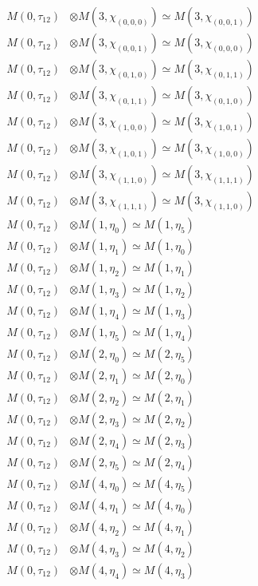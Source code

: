 \begin{align*}
M(0,\tau_{12}) &\otimes M(3,\chi_{(0,0,0)}) \simeq M(3,\chi_{(0,0,1)}) \\
M(0,\tau_{12}) &\otimes M(3,\chi_{(0,0,1)}) \simeq M(3,\chi_{(0,0,0)}) \\
M(0,\tau_{12}) &\otimes M(3,\chi_{(0,1,0)}) \simeq M(3,\chi_{(0,1,1)}) \\
M(0,\tau_{12}) &\otimes M(3,\chi_{(0,1,1)}) \simeq M(3,\chi_{(0,1,0)}) \\
M(0,\tau_{12}) &\otimes M(3,\chi_{(1,0,0)}) \simeq M(3,\chi_{(1,0,1)}) \\
M(0,\tau_{12}) &\otimes M(3,\chi_{(1,0,1)}) \simeq M(3,\chi_{(1,0,0)}) \\
M(0,\tau_{12}) &\otimes M(3,\chi_{(1,1,0)}) \simeq M(3,\chi_{(1,1,1)}) \\
M(0,\tau_{12}) &\otimes M(3,\chi_{(1,1,1)}) \simeq M(3,\chi_{(1,1,0)}) \\
M(0,\tau_{12}) &\otimes M(1,\eta_{0}) \simeq M(1,\eta_{5}) \\
M(0,\tau_{12}) &\otimes M(1,\eta_{1}) \simeq M(1,\eta_{0}) \\
M(0,\tau_{12}) &\otimes M(1,\eta_{2}) \simeq M(1,\eta_{1}) \\
M(0,\tau_{12}) &\otimes M(1,\eta_{3}) \simeq M(1,\eta_{2}) \\
M(0,\tau_{12}) &\otimes M(1,\eta_{4}) \simeq M(1,\eta_{3}) \\
M(0,\tau_{12}) &\otimes M(1,\eta_{5}) \simeq M(1,\eta_{4}) \\
M(0,\tau_{12}) &\otimes M(2,\eta_{0}) \simeq M(2,\eta_{5}) \\
M(0,\tau_{12}) &\otimes M(2,\eta_{1}) \simeq M(2,\eta_{0}) \\
M(0,\tau_{12}) &\otimes M(2,\eta_{2}) \simeq M(2,\eta_{1}) \\
M(0,\tau_{12}) &\otimes M(2,\eta_{3}) \simeq M(2,\eta_{2}) \\
M(0,\tau_{12}) &\otimes M(2,\eta_{4}) \simeq M(2,\eta_{3}) \\
M(0,\tau_{12}) &\otimes M(2,\eta_{5}) \simeq M(2,\eta_{4}) \\
M(0,\tau_{12}) &\otimes M(4,\eta_{0}) \simeq M(4,\eta_{5}) \\
M(0,\tau_{12}) &\otimes M(4,\eta_{1}) \simeq M(4,\eta_{0}) \\
M(0,\tau_{12}) &\otimes M(4,\eta_{2}) \simeq M(4,\eta_{1}) \\
M(0,\tau_{12}) &\otimes M(4,\eta_{3}) \simeq M(4,\eta_{2}) \\
M(0,\tau_{12}) &\otimes M(4,\eta_{4}) \simeq M(4,\eta_{3}) \\

\end{align*}
